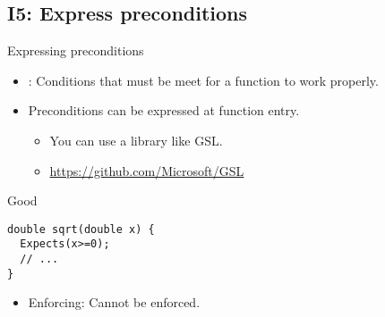 \subsection{I5: Express preconditions}

\begin{frame}[t,fragile]{Expressing preconditions}
\begin{itemize}
  \item {}: Conditions that must be meet 
        for a function to work properly.
  \item Preconditions can be expressed at function entry.
    \begin{itemize}
      \item You can use a library like GSL.
      \item \url{https://github.com/Microsoft/GSL}
    \end{itemize}
\end{itemize}

\begin{block}{Good}
\begin{lstlisting}
double sqrt(double x) {
  Expects(x>=0);
  // ...
}
\end{lstlisting}
\end{block}

\begin{itemize}
  \item Enforcing: Cannot be enforced.
\end{itemize}

\end{frame}
